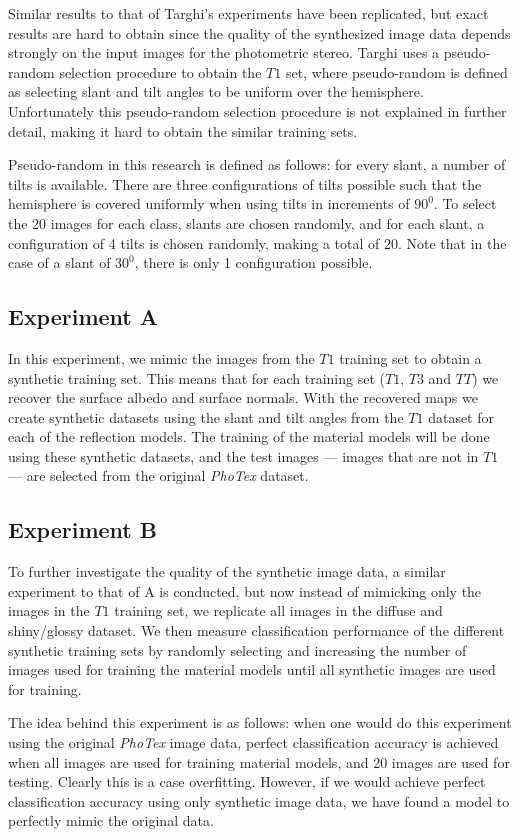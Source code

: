 Similar results to that of Targhi's experiments have been replicated, but exact results are hard to obtain since the quality of the synthesized image data depends strongly on the input images for the photometric stereo. Targhi uses a pseudo-random selection procedure to obtain the $T1$ set, where pseudo-random is defined as selecting slant and tilt angles to be uniform over the hemisphere. Unfortunately this pseudo-random selection procedure is not explained in further detail, making it hard to obtain the similar training sets.

Pseudo-random in this research is defined as follows: for every slant, a number of tilts is available. There are three configurations of tilts possible such that the hemisphere is covered uniformly when using tilts in increments of $90^0$. To select the 20 images for each class, slants are chosen randomly, and for each slant, a configuration of 4 tilts is chosen randomly, making a total of 20. Note that in the case of a slant of $30^0$, there is only 1 configuration possible. 

\subsection{Experiment A}
In this experiment, we mimic the images from the $T1$ training set to obtain a synthetic training set. This means that for each training set ($T1$, $T3$ and $TT$) we recover the surface albedo and surface normals. With the recovered maps we create synthetic datasets using the slant and tilt angles from the $T1$ dataset for each of the reflection models. The training of the material models will be done using these synthetic datasets, and the test images --- images that are not in $T1$ --- are selected from the original {\it PhoTex} dataset.

\subsection{Experiment B}
To further investigate the quality of the synthetic image data, a similar experiment to that of A is conducted, but now instead of mimicking only the images in the $T1$ training set, we replicate all images in the diffuse and shiny/glossy dataset. We then measure classification performance of the different synthetic training sets by randomly selecting and increasing the number of images used for training the material models until all synthetic images are used for training. 

The idea behind this experiment is as follows: when one would do this experiment using the original {\it PhoTex} image data, perfect classification accuracy is achieved when all images are used for training material models, and 20 images are used for testing. Clearly this is a case overfitting. However, if we would achieve perfect classification accuracy using only synthetic image data, we have found a model to perfectly mimic the original data.

